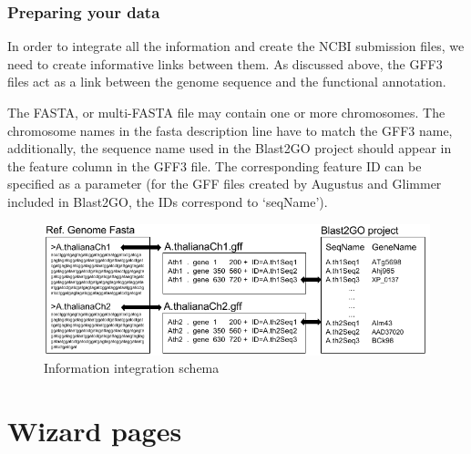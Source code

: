 \subsubsection{Preparing your data}

In order to integrate all the information and create the NCBI submission
files, we need to create informative links between them. As discussed above, the
GFF3 files act as a link between the genome sequence and the functional
annotation.

The FASTA, or multi-FASTA file may contain one or more chromosomes. The
chromosome names in the fasta description line have to match the GFF3 name,
additionally, the sequence name used in the Blast2GO project should appear in
the feature column in the GFF3 file. The corresponding feature ID can be specified
as a parameter (for the GFF files created by Augustus and Glimmer included in
Blast2GO, the IDs correspond to `seqName').


\begin{figure}[!h] \centering
\includegraphics[width=\textwidth]{img/Submission_links.png}
\caption{Information integration schema}
\label{fig:ncbisublinkfiles}
\end{figure}


\section{Wizard pages}
